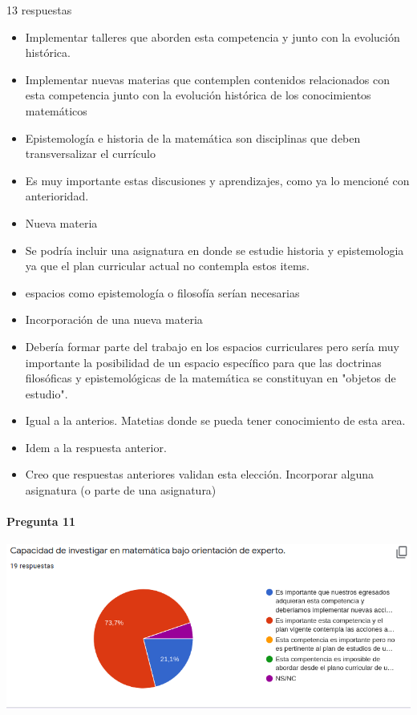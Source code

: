 \documentclass[a4paper,10pt,BCOR10mm,oneside,headsepline]{scrbook}
\begin{document}
\begin{subappendices}
13 respuestas
\begin{itemize}
 \item Implementar talleres que aborden esta competencia y junto con la evolución histórica.
 
\item Implementar nuevas materias que contemplen contenidos relacionados con esta competencia junto con la evolución histórica de los conocimientos matemáticos

\item Epistemología e historia de la matemática son disciplinas que deben transversalizar el currículo

\item Es muy importante estas discusiones y aprendizajes, como ya lo mencioné con anterioridad.

\item Nueva materia

\item Se podría incluir una asignatura en donde se estudie historia y epistemologia ya que el plan curricular actual no contempla estos items. 

\item espacios como epistemología o filosofía serían necesarias

\item Incorporación de una  nueva materia

\item Debería formar parte del trabajo en los espacios curriculares pero sería muy importante la posibilidad de un espacio específico para que las doctrinas filosóficas y epistemológicas de la matemática se constituyan en "objetos de estudio".

\item Igual a la anterios. Matetias donde se pueda tener conocimiento de esta area.

\item Idem a la respuesta anterior. 

\item Creo que respuestas anteriores validan esta elección.
Incorporar alguna asignatura (o parte de una asignatura)
\end{itemize}


  \paragraph{Pregunta 11}
\begin{center}
 
\includegraphics[scale=.9]{doc11.png}
 \end{center}


\end{subappendices}
\end{document}
